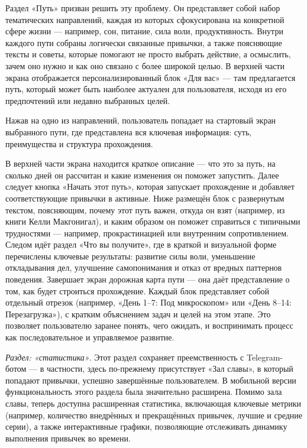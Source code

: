 \documentclass[pdflatex,sn-mathphys-num]{sn-jnl}%
\theoremstyle{thmstyleone}%
\theoremstyle{thmstyletwo}%
\theoremstyle{thmstylethree}%
\begin{document}
Раздел «Путь» призван решить эту проблему. Он представляет собой набор тематических направлений, каждая из которых сфокусирована на конкретной сфере жизни — например, сон, питание, сила воли, продуктивность. Внутри каждого пути собраны логически связанные привычки, а также поясняющие тексты и советы, которые помогают не просто выбрать действие, а осмыслить, зачем оно нужно и как оно связано с более широкой целью. В верхней части экрана отображается персонализированный блок «Для вас» — там предлагается путь, который может быть наиболее актуален для пользователя, исходя из его предпочтений или недавно выбранных целей.

Нажав на одно из направлений, пользователь попадает на стартовый экран выбранного пути, где представлена вся ключевая информация: суть, преимущества и структура прохождения.

В верхней части экрана находится краткое описание — что это за путь, на сколько дней он рассчитан и какие изменения он поможет запустить. Далее следует кнопка «Начать этот путь», которая запускает прохождение и добавляет соответствующие привычки в активные. Ниже размещён блок с развернутым текстом, поясняющим, почему этот путь важен, откуда он взят (например, из книги Келли Макгонигал), и каким образом он поможет справиться с типичными трудностями — например, прокрастинацией или внутренним сопротивлением. Следом идёт раздел «Что вы получите», где в краткой и визуальной форме перечислены ключевые результаты: развитие силы воли, уменьшение откладывания дел, улучшение самопонимания и отказ от вредных паттернов поведения. Завершает экран дорожная карта пути — она даёт представление о том, как будет строиться прохождение. Каждый блок представляет собой отдельный отрезок (например, «День 1–7: Под микроскопом» или «День 8–14: Перезагрузка»), с кратким объяснением задач и целей на этом этапе. Это позволяет пользователю заранее понять, чего ожидать, и воспринимать процесс как последовательное и управляемое развитие.

\textit{Раздел: «статистика»}. Этот раздел сохраняет преемственность с Telegram-ботом — в частности, здесь по-прежнему присутствует «Зал славы», в который попадают привычки, успешно завершённые пользователем. В мобильной версии функциональность этого раздела была значительно расширена. Помимо зала славы, теперь доступна расширенная статистика, включающая ключевые метрики (например, количество внедрённых и прекращённых привычек, лучшие и средние серии), а также интерактивные графики, позволяющие отслеживать динамику выполнения привычек во времени.
\end{document}
